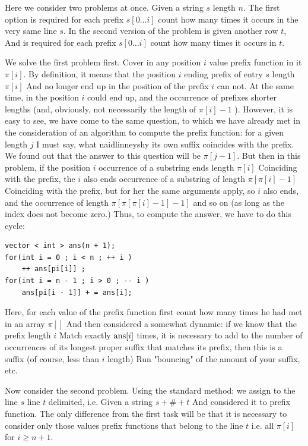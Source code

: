 Here we consider two problems at once. Given a string $s$ length $n$. The first option is required for each prefix $s [0 \ldots i]$ count how many times it occurs in the very same line $s$. In the second version of the problem is given another row $t$, And is required for each prefix $s [0 \ldots i]$ count how many times it occurs in $t$.

We solve the first problem first. Cover in any position $i$ value prefix function in it $\pi [i]$. By definition, it means that the position $i$ ending prefix of entry $s$ length $\pi [i]$ And no longer end up in the position of the prefix $i$ can not. At the same time, in the position $i$ could end up, and the occurrence of prefixes shorter lengths (and, obviously, not necessarily the length of $\pi [i] -1$ ). However, it is easy to see, we have come to the same question, to which we have already met in the consideration of an algorithm to compute the prefix function: for a given length $j$ I must say, what naidlinneyshy its own suffix coincides with the prefix. We found out that the answer to this question will be $\pi [j-1]$. But then in this problem, if the position $i$ occurrence of a substring ends length $\pi [i]$ Coinciding with the prefix, the $i$ also ends occurrence of a substring of length $\pi [\pi [i] -1]$ Coinciding with the prefix, but for her the same arguments apply, so $i$ also ends, and the occurrence of length $\pi [\pi [\pi [i] -1] -1]$ and so on (as long as the index does not become zero.) Thus, to compute the answer, we have to do this cycle:

\begin{verbatim}
vector < int > ans(n + 1);
for(int i = 0 ; i < n ; ++ i )
    ++ ans[pi[i]] ;
for(int i = n - 1 ; i > 0 ; -- i )
    ans[pi[i - 1]] + = ans[i]; 
\end{verbatim}
Here, for each value of the prefix function first count how many times he had met in an array $\pi []$ And then considered a somewhat dynamic: if we know that the prefix length $i$ Match exactly ${\rm ans} [i]$ times, it is necessary to add to the number of occurrences of its longest proper suffix that matches its prefix, then this is a suffix (of course, less than $i$ length) Run "bouncing" of the amount of your suffix, etc.

Now consider the second problem. Using the standard method: we assign to the line $s$ line $t$ delimited, i.e. Given a string $s + \# + t$ And considered it to prefix function. The only difference from the first task will be that it is necessary to consider only those values ​​prefix functions that belong to the line $t$ i.e. all $\pi [i]$ for $i \ge n +1$.

